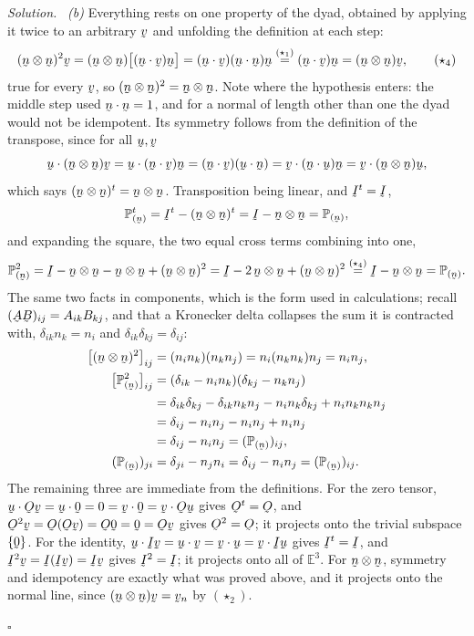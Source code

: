 \documentclass[17pt,a4paper]{extreport}
\DeclareRobustCommand{\vek}[1]{\underaccent{\tilde}{#1}}
\newcommand{\Et}{\mathbb{E}^{3}}
\newcommand{\Proj}[1]{\mathbb{P}_{(#1)}}
\newcommand{\I}{\vek{I}}
\newcommand{\Ob}{\vek{O}}
\newcommand{\bu}{\vek{u}}
\newcommand{\bv}{\vek{v}}
\newcommand{\bn}{\vek{n}}
\newcommand{\bze}{\vek{0}}
\newcommand{\bA}{\vek{A}}
\newcommand{\bB}{\vek{B}}
\newcommand{\dd}{\delta}
\newcommand{\ip}[2]{#1\cdot#2}
\theoremstyle{scplain}
\theoremstyle{scdefn}
\theoremstyle{scplain}
\newenvironment{solution}
 {\par\smallskip\noindent\textit{Solution.}\ }
 {\hfill$\square$\par\medskip}
\begin{document}
\begin{solution}
\emph{(b)} Everything rests on one property of the dyad, obtained by
applying it twice to an arbitrary $\bv$ and unfolding the definition at each
step:
\begin{equation}
   (\bn\otimes\bn)^{2}\bv=(\bn\otimes\bn)\big[(\ip\bn\bv)\bn\big]
   =(\ip\bn\bv)(\ip\bn\bn)\bn
   \overset{(\star_1)}{=}(\ip\bn\bv)\bn=(\bn\otimes\bn)\bv , \tag{$\star_4$}
\end{equation}
true for every $\bv$, so $(\bn\otimes\bn)^{2}=\bn\otimes\bn$. Note where the
hypothesis enters: the middle step used $\ip\bn\bn=1$, and for a normal of
length other than one the dyad would not be idempotent. Its symmetry follows
from the definition of the transpose, since for all $\bu,\bv$
\[
   \ip\bu{(\bn\otimes\bn)\bv}=\ip{\bu}{(\ip\bn\bv)\bn}
   =(\ip\bn\bv)(\ip\bu\bn)=\ip\bv{(\ip\bn\bu)\bn}
   =\ip\bv{(\bn\otimes\bn)\bu},
\]
which says $(\bn\otimes\bn)^{t}=\bn\otimes\bn$. Transposition being linear,
and $\I^{t}=\I$,
\[
   \Proj{\bn}^{t}=\I^{t}-(\bn\otimes\bn)^{t}=\I-\bn\otimes\bn=\Proj{\bn},
\]
and expanding the square, the two equal cross terms combining into one,
\[
   \Proj{\bn}^{2}=\I-\bn\otimes\bn-\bn\otimes\bn+(\bn\otimes\bn)^{2}
   =\I-2\,\bn\otimes\bn+(\bn\otimes\bn)^{2}
   \overset{(\star_4)}{=}\I-\bn\otimes\bn=\Proj{\bn}.
\]
The same two facts in components, which is the form used in calculations;
recall $(\bA\bB)_{ij}=A_{ik}B_{kj}$, and that a Kronecker delta collapses
the sum it is contracted with, $\dd_{ik}n_k=n_i$ and
$\dd_{ik}\dd_{kj}=\dd_{ij}$:
\[
\begin{aligned}
   \big[(\bn\otimes\bn)^{2}\big]_{ij}&=(n_in_k)(n_kn_j)
   =n_i(n_kn_k)n_j=n_in_j,\\
   \big[\Proj{\bn}^{2}\big]_{ij}&=(\dd_{ik}-n_in_k)(\dd_{kj}-n_kn_j)\\
   &=\dd_{ik}\dd_{kj}-\dd_{ik}n_kn_j-n_in_k\dd_{kj}+n_in_k n_kn_j\\
   &=\dd_{ij}-n_in_j-n_in_j+n_in_j\\
   &=\dd_{ij}-n_in_j=(\Proj{\bn})_{ij},\\
   (\Proj{\bn})_{ji}&=\dd_{ji}-n_jn_i=\dd_{ij}-n_in_j=(\Proj{\bn})_{ij}.
\end{aligned}
\]
The remaining three are immediate from the definitions. For the zero tensor,
$\ip\bu{\Ob\bv}=\ip\bu\bze=0=\ip\bv\bze=\ip\bv{\Ob\bu}$ gives $\Ob^{t}=\Ob$,
and $\Ob^{2}\bv=\Ob(\Ob\bv)=\Ob\bze=\bze=\Ob\bv$ gives $\Ob^{2}=\Ob$; it
projects onto the trivial subspace $\{\bze\}$. For the identity,
$\ip\bu{\I\bv}=\ip\bu\bv=\ip\bv\bu=\ip\bv{\I\bu}$ gives $\I^{t}=\I$, and
$\I^{2}\bv=\I(\I\bv)=\I\bv$ gives $\I^{2}=\I$; it projects onto all of
$\Et$. For $\bn\otimes\bn$, symmetry and idempotency are exactly what was
proved above, and it projects onto the normal line, since
$(\bn\otimes\bn)\bv=\bv_n$ by $(\star_2)$.



\end{solution}
\end{document}
